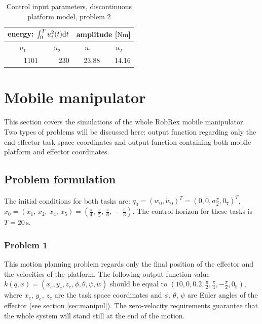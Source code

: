 \begin{table}[htb]
\caption{Control input parameters, discontinuous platform model, problem 2}
\label{tab:in_discont_ok}
\centering
\begin{tabular}{|r|r|r|r|}
\hline
\multicolumn{2}{|c|}{energy: $\int_0^Tu_i^2(t)\mathrm{d} t$}                             & \multicolumn{2}{c|}{amplitude [$\mathrm{Nm}$]}                          \\ \hline
\multicolumn{1}{|c|}{$u_1$} & \multicolumn{1}{c|}{$u_2$} & \multicolumn{1}{c|}{$u_1$} & \multicolumn{1}{c|}{$u_2$} \\ \hline
1101                       & 230                        & 23.88                      & 14.16                      \\ \hline
\end{tabular}
\end{table}



\section{Mobile manipulator}
This section covers the simulations of the whole RobRex mobile manipulator. Two types of problems will
be discussed here: output function regarding only the end-effector task space coordinates
and output function containing both mobile platform and effector coordinates.
\subsection{Problem formulation}
The initial conditions for both tasks are: $q_0 = (w_0, \dot{w}_0)^T = (0, 0, a\frac{\pi}{2}, 0_7)^T$, 
$x_0 = \left(
x_1 ,\, x_2 ,\, x_4 ,\, x_5
\right) = \left(
\frac{\pi}{4} ,\, \frac{\pi}{5} ,\, \frac{\pi}{6} ,\, -\frac{\pi}{3}
\right).$ The control horizon for these tasks is $T=20\,\mathrm{s}$.
\subsubsection{Problem 1}
This motion planning problem regards only the final position of the effector
and the velocities of the platform. 
The following output function value $k(q, x) = (x_e, y_e, z_e, \phi, \theta, \psi, \dot w) $ should be equal to
$(10, 0, 0.2, \frac{\pi}{2}, \frac{\pi}{4}, -\frac{\pi}{2}, 0_5)$, where
$x_e$, $y_e$, $z_e$ are the task space coordinates and $\phi$, $\theta$, $\psi$
are Euler angles of the effector (see section \ref{sec:manipul}). The zero-velocity
requirements guarantee that the whole system will stand still at the end
of the motion.

